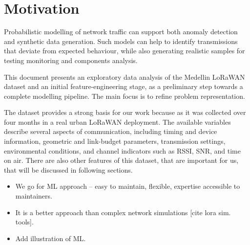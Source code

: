 \documentclass[11pt]{article}
\begin{document}
\section{Motivation}
\label{sec:orgc354a7c}

Probabilistic modelling of network traffic can support both anomaly detection and synthetic data generation. Such models can help to identify transmissions that deviate from expected behaviour, while also generating realistic samples for testing monitoring and  components analysis.

This document presents an exploratory data analysis of the Medellin LoRaWAN dataset and an initial feature-engineering stage, as a preliminary step towards a complete modelling pipeline. The main focus is to refine problem representation.

The dataset provides a strong basis for our work because as it was collected over four months in a real urban LoRaWAN deployment. The available variables describe several aspects of communication, including timing and device information, geometric and link-budget parameters, transmission settings, environmental conditions, and channel indicators such as RSSI, SNR, and time on air. There are also other features of this dataset, that are important for us, that will be discussed in following sections.

\begin{itemize}
\item We go for ML approach -- easy to maintain, flexible, expertise accessible to maintainers.
\item It is a better approach than complex network simulations [cite lora sim. tools].
\item Add illustration of ML.
\end{itemize}
\end{document}
